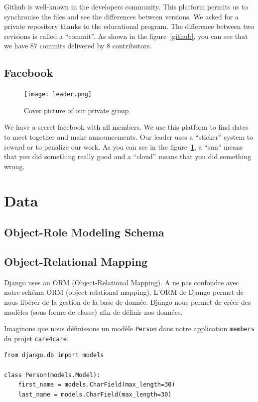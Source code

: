 \documentclass[11pt, a4paper]{article}   	%
\begin{document}
Github is well-known in the developers community.
This platform permits us to synchronise the files and see the differences between versions.
We asked for a private repository thanks to the educational program.
The difference between two revisions is called a \enquote{commit}.
As shown in the figure~\ref{github}, you can see that we have 87 commits delivered by 8 contributors.

\subsection{Facebook}

\begin{figure}[!ht]
   \texttt{[image: leader.png]}
   \caption{\label{facebook} Cover picture of our private group}
\end{figure}

We have a secret facebook with all members.
We use this platform to find dates to meet together and make announcements.
Our leader uses a \enquote{sticker} system to reward or to penalize our work. As you can see in the figure~\ref{facebook}, a \enquote{sun} means that you did something really good and a \enquote{cloud} means that you did something wrong.





\section{Data}
\subsection{Object-Role Modeling Schema}


\subsection{Object-Relational Mapping}
Django uses an ORM (Object-Relational Mapping).
A ne pas confondre avec notre schéma ORM (object-relational mapping).
L'ORM de Django permet de nous libérer de la gestion de la base de donnée.
Django nous permet de créer des modèles (sous forme de classe) afin de définir nos données.

Imaginons que nous définissons un modèle \texttt{Person} dans notre application \texttt{members} du projet \texttt{care4care}.

\begin{lstlisting}[frame=single, caption=file care4care/members/models.py]  % Start your code-block
from django.db import models

class Person(models.Model):
    first_name = models.CharField(max_length=30)
    last_name = models.CharField(max_length=30)
\end{lstlisting}
\end{document}
